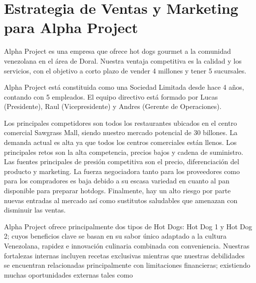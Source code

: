 

\section{Estrategia de Ventas y Marketing para Alpha Project}\label{sec:estrategia-ventas-marketing}
Alpha Project es una empresa que ofrece hot dogs gourmet a la comunidad venezolana en el área de Doral. Nuestra ventaja competitiva es la calidad y los servicios, con el objetivo a corto plazo de vender 4 millones y tener 5 sucursales. 

Alpha Project está constituida como una Sociedad Limitada desde hace 4 años, contando con 5 empleados. El equipo directivo está formado por Lucas (Presidente), Raul (Vicepresidente) y Andres (Gerente de Operaciones). 

Los principales competidores son todos los restaurantes ubicados en el centro comercial Sawgrass Mall, siendo nuestro mercado potencial de 30 billones. La demanda actual es alta ya que todos los centros comerciales están llenos. Los principales retos son la alta competencia, precios bajos y cadena de suministro. Las fuentes principales de presión competitiva son el precio, diferenciación del producto y marketing. La fuerza negociadora tanto para los proveedores como para los compradores es baja debido a su escasa variedad en cuanto al pan disponible para preparar hotdogs. Finalmente, hay un alto riesgo por parte nuevas entradas al mercado así como sustitutos saludables que amenazan con disminuir las ventas.  

Alpha Project ofrece principalmente dos tipos de Hot Dogs: Hot Dog 1 y Hot Dog 2; cuyos beneficios clave se basan en su sabor único adaptado a la cultura Venezolana, rapidez e innovación culinaria combinada con conveniencia. Nuestras fortalezas internas incluyen recetas exclusivas mientras que nuestras debilidades se encuentran relacionadas principalmente con limitaciones financieras; existiendo muchas oportunidades externas tales como